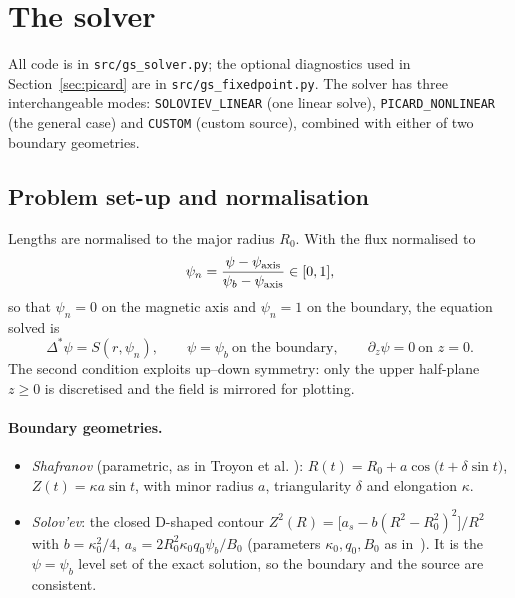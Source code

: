 \documentclass[11pt,a4paper]{article}
\newcommand{\Dstar}{\Delta^{\!*}}
\newcommand{\pn}{\psi_n}
\begin{document}
\section{The solver}\label{sec:solver}
All code is in \texttt{src/gs\_solver.py}; the optional diagnostics used in Section~\ref{sec:picard} are in \texttt{src/gs\_fixedpoint.py}. The solver has three interchangeable modes: \texttt{SOLOVIEV\_LINEAR} (one linear solve), \texttt{PICARD\_NONLINEAR} (the general case) and \texttt{CUSTOM} (custom source), combined with either of two boundary geometries.

\subsection{Problem set-up and normalisation}
Lengths are normalised to the major radius $R_0$. With the flux normalised to
\begin{equation}
\pn=\frac{\psi-\psi_{\rm axis}}{\psi_b-\psi_{\rm axis}}\in[0,1],
\end{equation}
so that $\pn=0$ on the magnetic axis and $\pn=1$ on the boundary, the equation solved is
\begin{equation}
\Dstar\psi=S(r,\pn),\qquad \psi=\psi_b\ \text{on the boundary},\qquad \partial_z\psi=0\ \text{on } z=0 .
\label{eq:model}
\end{equation}
The second condition exploits up--down symmetry: only the upper half-plane $z\ge0$ is discretised and the field is mirrored for plotting.

\paragraph{Boundary geometries.}
\begin{itemize}[nosep]
\item \emph{Shafranov} (parametric, as in Troyon et al. \cite{troyon1984}): $R(t)=R_0+a\cos\!\big(t+\delta\sin t\big)$, $Z(t)=\kappa a\sin t$, with minor radius $a$, triangularity $\delta$ and elongation $\kappa$.
\item \emph{Solov'ev}: the closed D-shaped contour $Z^2(R)=\big[a_s-b(R^2-R_0^2)^2\big]/R^2$ with $b=\kappa_0^2/4$, $a_s=2R_0^2\kappa_0 q_0\psi_b/B_0$ (parameters $\kappa_0,q_0,B_0$ as in~\cite{lopez2019}). It is the $\psi=\psi_b$ level set of the exact solution, so the boundary and the source are consistent.
\end{itemize}
\end{document}
